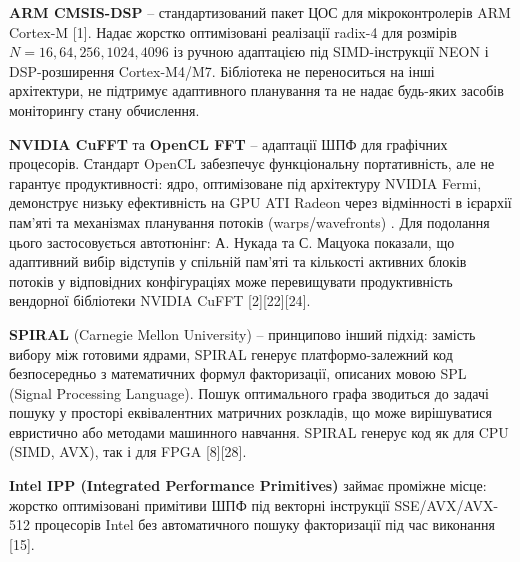 \documentclass[
]{article}
\begin{document}
\textbf{ARM CMSIS-DSP} -- стандартизований пакет ЦОС для
мікроконтролерів ARM Cortex-M {[}1{]}. Надає жорстко оптимізовані
реалізації radix-4 для розмірів \(N = 16,64,256,1024,4096\) із ручною
адаптацією під SIMD-інструкції NEON і DSP-розширення Cortex-M4/M7.
Бібліотека не переноситься на інші архітектури, не підтримує адаптивного
планування та не надає будь-яких засобів моніторингу стану обчислення.

\textbf{NVIDIA CuFFT} та \textbf{OpenCL FFT} -- адаптації ШПФ для
графічних процесорів. Стандарт OpenCL забезпечує функціональну
портативність, але не гарантує продуктивності: ядро, оптимізоване під
архітектуру NVIDIA Fermi, демонструє низьку ефективність на GPU ATI
Radeon через відмінності в ієрархії пам'яті та механізмах планування
потоків (warps/wavefronts) . Для подолання цього застосовується
автотюнінг: А. Нукада та С. Мацуока показали, що адаптивний вибір
відступів у спільній пам'яті та кількості активних блоків потоків у
відповідних конфігураціях може перевищувати продуктивність вендорної
бібліотеки NVIDIA CuFFT {[}2{]}{[}22{]}{[}24{]}.

\textbf{SPIRAL} (Carnegie Mellon University) -- принципово інший підхід:
замість вибору між готовими ядрами, SPIRAL генерує платформо-залежний
код безпосередньо з математичних формул факторизації, описаних мовою SPL
(Signal Processing Language). Пошук оптимального графа зводиться до
задачі пошуку у просторі еквівалентних матричних розкладів, що може
вирішуватися евристично або методами машинного навчання. SPIRAL генерує
код як для CPU (SIMD, AVX), так і для FPGA {[}8{]}{[}28{]}.

\textbf{Intel IPP (Integrated Performance Primitives)} займає проміжне
місце: жорстко оптимізовані примітиви ШПФ під векторні інструкції
SSE/AVX/AVX-512 процесорів Intel без автоматичного пошуку факторизації
під час виконання {[}15{]}.
\end{document}
